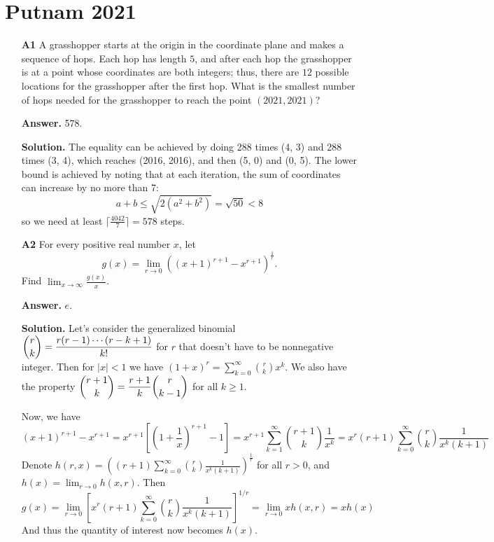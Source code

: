 \documentclass[11pt,a4paper]{article}
\newcommand{\<}{\langle}
\renewcommand{\>}{\rangle}
\begin{document}
\newcommand{\sgn}{\text{sgn}}
\setcounter{secnumdepth}{0}

\section{Putnam 2021}
\begin{enumerate}
	\item [\textbf{A1}] A grasshopper starts at the origin in the coordinate plane and makes a sequence of hops. 
	Each hop has length $5$, and after each hop the grasshopper is at a point whose coordinates are both integers; 
	thus, there are $12$ possible locations for the grasshopper after the first hop. 
	What is the smallest number of hops needed for the grasshopper to reach the point $(2021,2021)$?
	
	\textbf{Answer.} 578. 
	
	\textbf{Solution.} The equality can be achieved by doing 288 times (4, 3) and 288 times (3, 4), which reaches (2016, 2016), and then (5, 0) and (0, 5). 
	The lower bound is achieved by noting that at each iteration, 
	the sum of coordinates can increase by no more than 7: 
	\[
	a+b\le \sqrt{2(a^2+b^2)}=\sqrt{50} < 8
	\]
	so we need at least $\lceil \frac{4042}{7}\rceil = 578$ steps. 
	
	\item [\textbf{A2}] For every positive real number $x$, let
	\[
	g(x)=\lim_{r\to 0}  ((x+1)^{r+1}-x^{r+1})^{\frac{1}{r}}.
	\]
	Find $\lim_{x\to \infty}\frac{g(x)}{x}$.
	
	\textbf{Answer.} $e$. 
	
	\textbf{Solution.} 
	Let's consider the generalized binomial $\dbinom{r}{k}=\dfrac{r(r-1)\cdots (r-k+1)}{k!}$ for $r$ that doesn't have to be nonnegative integer. Then for $|x|<1$ we have $(1+x)^r = \sum_{k=0}^{\infty} \binom{r}{k}x^k$.
	We also have the property $\dbinom{r+1}{k}=\dfrac{r+1}{k}\dbinom{r}{k-1}$ for all $k\ge 1$.
	
	Now, we have
	\[
	(x+1)^{r+1}-x^{r+1}
	=x^{r+1}\left[(1+\frac{1}{x})^{r+1}-1\right] = x^{r+1}\sum_{k=1}^{\infty}\binom{r+1}{k}\frac{1}{x^k}
	=x^r(r+1)\sum_{k=0}^{\infty}\binom{r}{k}\frac{1}{x^k(k+1)}
	\]
	Denote $h(r, x)=\left((r+1)\sum_{k=0}^{\infty}\binom{r}{k}\frac{1}{x^k(k+1)}\right)^{\frac{1}{r}}$ for all $r>0$, and $h(x)=\lim_{r\to 0}h(x, r)$.
	Then
	\[
	g(x)=\lim_{r\to 0}\left[x^r(r+1)\sum_{k=0}^{\infty}\binom{r}{k}\frac{1}{x^k(k+1)}\right]^{1/r}
	=\lim_{r\to 0}xh(x, r) = xh(x)
	\]
	And thus the quantity of interest now becomes $h(x)$.
	

\end{enumerate}
\end{document}
